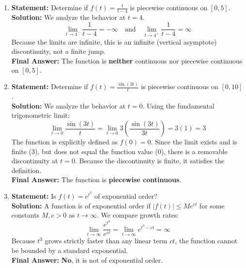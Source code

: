 \documentclass[11pt, letterpaper]{article}
\theoremstyle{definition}
\theoremstyle{remark}
\begin{document}
\begin{enumerate}[label=\textbf{Solution \arabic*.}, leftmargin=*]
\begin{center}
    \end{center}

    \item \textbf{Statement:} Determine if $f(t) = \frac{1}{t-4}$ is piecewise continuous on $[0, 5]$.\\
    \textbf{Solution:} We analyze the behavior at $t = 4$. 
    \[
    \lim_{t \to 4^-} \frac{1}{t-4} = -\infty \quad \text{and} \quad \lim_{t \to 4^+} \frac{1}{t-4} = \infty
    \]
    Because the limits are infinite, this is an infinite (vertical asymptote) discontinuity, not a finite jump. \\
    \textbf{Final Answer:} The function is \textbf{neither} continuous nor piecewise continuous on $[0, 5]$.

    \item \textbf{Statement:} Determine if $f(t) = \frac{\sin(3t)}{t}$ is piecewise continuous on $[0, 10]$.\\
    \textbf{Solution:} We analyze the behavior at $t = 0$. Using the fundamental trigonometric limit:
    \[
    \lim_{t \to 0} \frac{\sin(3t)}{t} = \lim_{t \to 0} 3 \left( \frac{\sin(3t)}{3t} \right) = 3(1) = 3
    \]
    The function is explicitly defined as $f(0) = 0$. Since the limit exists and is finite ($3$), but does not equal the function value ($0$), there is a removable discontinuity at $t = 0$. Because the discontinuity is finite, it satisfies the definition.\\
    \textbf{Final Answer:} The function is \textbf{piecewise continuous}.

    \item \textbf{Statement:} Is $f(t) = e^{t^3}$ of exponential order?\\
    \textbf{Solution:} A function is of exponential order if $|f(t)| \le M e^{ct}$ for some constants $M, c > 0$ as $t \to \infty$. We compare growth rates:
    \[
    \lim_{t \to \infty} \frac{e^{t^3}}{e^{ct}} = \lim_{t \to \infty} e^{t^3 - ct} = \infty
    \]
    Because $t^3$ grows strictly faster than any linear term $ct$, the function cannot be bounded by a standard exponential.\\
    \textbf{Final Answer:} \textbf{No}, it is not of exponential order.


\end{enumerate}
\end{document}
